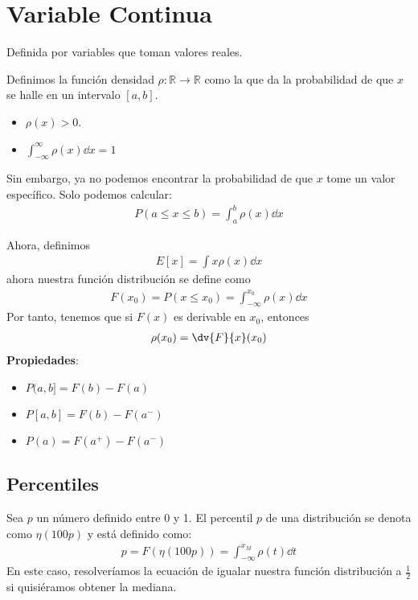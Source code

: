 \documentclass{./Probabilidad.tex}
\begin{document}
\chapter{Variable Continua}
Definida por variables que toman valores reales.
\begin{defin}
	Definimos la función densidad $\rho: \mathbb{R} \to \mathbb{R}$ como la que da la probabilidad de que $x$ se halle en un intervalo $[a,b]$.
	\begin{itemize}
		\item $\rho(x)> 0$.
		\item $\int_{-\infty}^{\infty} \rho(x)\dd{x} = 1$ 
	\end{itemize}
	Sin embargo, ya no podemos encontrar la probabilidad de que $x$ tome un valor específico. Solo podemos calcular:
	\begin{equation}
		\begin{split}
			P(a \leq x \leq b) = \int_{a}^{b} \rho(x) \dd{x}
		\end{split}
	\end{equation}
\end{defin}
Ahora, definimos
\begin{equation}
	\begin{split}
		E[x] = \int x \rho(x) \dd{x}
	\end{split}
\end{equation}
ahora nuestra función distribución se define como
\begin{equation}
	\begin{split}
		F(x_0) = P(x \leq x_0) = \int_{-\infty}^{x_0} \rho(x) \dd{x}
	\end{split}
\end{equation}
Por tanto, tenemos que si $F(x)$ es derivable en $x_0$, entonces
\begin{equation}
	\begin{split}
		\rho(x_0) = \dv{F}{x}(x_0)
	\end{split}
\end{equation}
\textbf{Propiedades}:
\begin{itemize}
	\item $P(a,b]= F(b) - F(a)$ 
	\item $P[a,b] = F(b) - F(a^{-})$ 
	\item $P(a) = F(a^{+}) - F(a^{-})$ 
\end{itemize}
\section{Percentiles}
Sea $p$ un número definido entre 0 y 1. El percentil $p$ de una distribución se denota como $\eta(100p)$ y está definido como:
\begin{equation}
	\begin{split}
		p = F(\eta(100p)) = \int_{-\infty}^{x_{M}}\rho(t)\dd{t}
	\end{split}
\end{equation}
En este caso, resolveríamos la ecuación de igualar nuestra función distribución a $\frac{1}{2}$ si quisiéramos obtener la mediana. 
\end{document}
